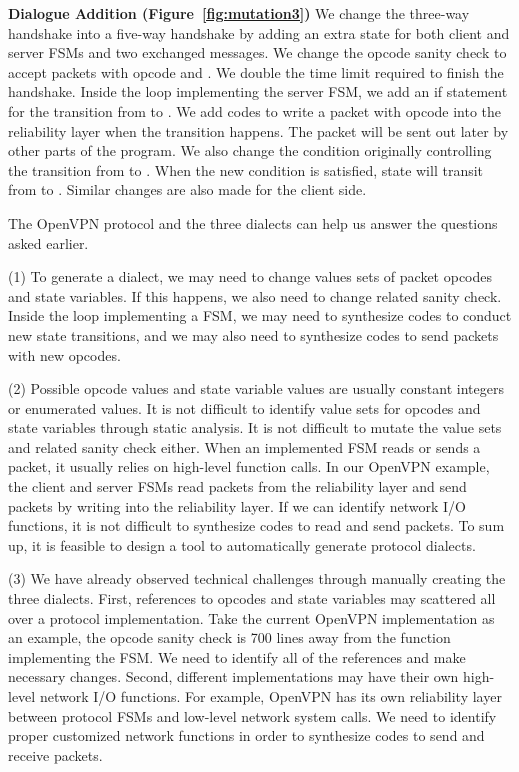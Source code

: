 {\textbf{Dialogue Addition (Figure~\ref{fig:mutation3})}}
We change the three-way handshake into a five-way handshake
by adding an extra state for both client and server FSMs and two exchanged messages. 
We change the opcode sanity check to accept packets with opcode  
and . 
We double the time limit required to finish the handshake. 
Inside the loop implementing the server FSM, we add an if statement for the transition from 
 to . 
We add codes to write a packet with opcode  
into the reliability layer when the transition happens. 
The packet will be sent out later by other parts of the program. 
We also change the condition originally controlling the transition from  to . 
When the new condition is satisfied, 
state will transit from  to . 
Similar changes are also made for the client side. 


The OpenVPN protocol and the three dialects can help us answer the questions asked earlier.

(1) To generate a dialect, we may need to change values sets of packet opcodes and state variables. 
If this happens, we also need to change related sanity check. 
Inside the loop implementing a FSM, we may need to synthesize codes 
to conduct new state transitions,
and we may also need to synthesize codes to send packets with new opcodes. 

(2) Possible opcode values and state variable values 
are usually constant integers or enumerated values.  
It is not difficult to identify value sets for opcodes and state variables through static analysis. 
It is not difficult to mutate the value sets and related sanity check either. 
When an implemented FSM reads or sends a packet, 
it usually relies on high-level function calls. 
In our OpenVPN example, the client and server FSMs read packets from the reliability layer 
and send packets by writing into the reliability layer. 
If we can identify network I/O functions, 
it is not difficult to synthesize codes to read and send packets.
To sum up, it is feasible to design a tool to automatically generate protocol dialects. 


(3) We have already observed technical challenges through manually creating the three dialects. 
First, references to opcodes and state variables may scattered all over a protocol implementation. 
Take the current OpenVPN implementation as an example, 
the opcode sanity check is 700 lines away from the function implementing the FSM. 
We need to identify all of the references and make necessary changes. 
Second, different implementations may have their own high-level network I/O functions.
For example, OpenVPN has its own reliability layer between protocol FSMs 
and low-level network system calls. 
We need to identify proper customized network functions 
in order to synthesize codes to send and receive packets. 


